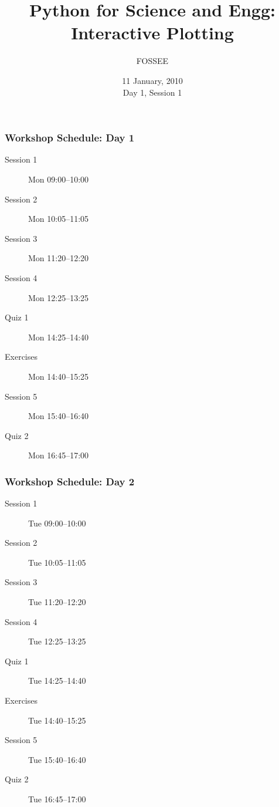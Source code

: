 \documentclass[14pt,compress]{beamer}
\title[Interactive Plotting]{Python for Science and Engg: Interactive Plotting}
\author[FOSSEE] {FOSSEE}
\institute[IIT Bombay] {Department of Aerospace Engineering\\IIT Bombay}
\date[] {11 January, 2010\\Day 1, Session 1}
\begin{document}
\begin{frame}
  \maketitle
\end{frame}


\begin{frame}
  \frametitle{Workshop Schedule: Day 1}
  \begin{description}
	\item[Session 1] Mon 09:00--10:00
	\item[Session 2] Mon 10:05--11:05
	\item[Session 3] Mon 11:20--12:20
	\item[Session 4] Mon 12:25--13:25
        \item[Quiz 1] Mon 14:25--14:40
        \item[Exercises] Mon 14:40--15:25
        \item[Session 5] Mon 15:40--16:40
        \item[Quiz 2] Mon 16:45--17:00
  \end{description}
\end{frame}

\begin{frame}
  \frametitle{Workshop Schedule: Day 2}
  \begin{description}
	\item[Session 1] Tue 09:00--10:00
	\item[Session 2] Tue 10:05--11:05
	\item[Session 3] Tue 11:20--12:20
	\item[Session 4] Tue 12:25--13:25
        \item[Quiz 1]  Tue 14:25--14:40
        \item[Exercises] Tue 14:40--15:25
        \item[Session 5] Tue 15:40--16:40
        \item[Quiz 2]  Tue 16:45--17:00
  \end{description}
\end{frame}
\end{document}

